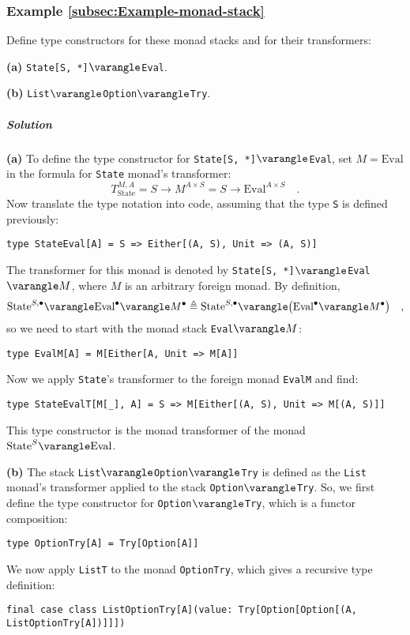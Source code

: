 \subsubsection{Example \label{subsec:Example-monad-stack}\ref{subsec:Example-monad-stack}}

Define type constructors for these monad stacks and for their transformers:

\textbf{(a)} \lstinline!State[S, *]!$\varangle$\lstinline!Eval!. 

\textbf{(b)} \lstinline!List!$\varangle$\lstinline!Option!$\varangle$\lstinline!Try!.

\subparagraph{Solution}

\textbf{(a)} To define the type constructor for \lstinline!State[S, *]!$\varangle$\lstinline!Eval!,
set $M=\text{Eval}$ in the formula for \lstinline!State! monad\textsf{'}s
transformer:
\[
T_{\text{State}}^{M,A}=S\rightarrow M^{A\times S}=S\rightarrow\text{Eval}^{A\times S}\quad.
\]
Now translate the type notation into code, assuming that the type
\lstinline!S! is defined previously:
\begin{lstlisting}
type StateEval[A] = S => Either[(A, S), Unit => (A, S)]
\end{lstlisting}

The transformer for this monad is denoted by \lstinline!State[S, *]!$\varangle$\lstinline!Eval!$\varangle M$,
where $M$ is an arbitrary foreign monad. By definition, 
\[
\text{State}^{S,\bullet}\varangle\text{Eval}^{\bullet}\varangle M^{\bullet}\triangleq\text{State}^{S,\bullet}\varangle\big(\text{Eval}^{\bullet}\varangle M^{\bullet}\big)\quad,
\]
so we need to start with the monad stack \lstinline!Eval!$\varangle M$:
\begin{lstlisting}
type EvalM[A] = M[Either[A, Unit => M[A]]
\end{lstlisting}
Now we apply \lstinline!State!\textsf{'}s transformer to the foreign monad
\lstinline!EvalM! and find:
\begin{lstlisting}
type StateEvalT[M[_], A] = S => M[Either[(A, S), Unit => M[(A, S)]]
\end{lstlisting}
This type constructor is the monad transformer of the monad $\text{State}^{S}\varangle\text{Eval}$.

\textbf{(b)} The stack \lstinline!List!$\varangle$\lstinline!Option!$\varangle$\lstinline!Try!
is defined as the \lstinline!List! monad\textsf{'}s transformer applied to
the stack \lstinline!Option!$\varangle$\lstinline!Try!. So, we
first define the type constructor for \lstinline!Option!$\varangle$\lstinline!Try!,
which is a functor composition:
\begin{lstlisting}
type OptionTry[A] = Try[Option[A]]
\end{lstlisting}
We now apply \lstinline!ListT! to the monad \lstinline!OptionTry!,
which gives a recursive type definition:
\begin{lstlisting}
final case class ListOptionTry[A](value: Try[Option[Option[(A, ListOptionTry[A])]]])
\end{lstlisting}

